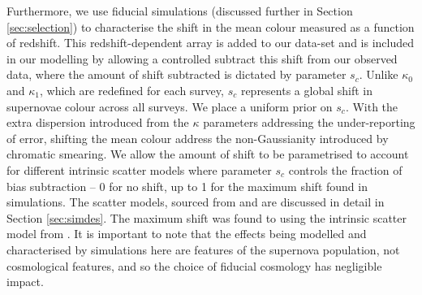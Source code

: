 \documentclass[a4paper,fleqn,usenatbib]{mnras}
\newcommand{\green}{\color{forestgreen}}
\begin{document}
Furthermore, we use fiducial simulations (discussed further in Section \ref{sec:selection}) to characterise the shift in the mean colour measured as a function of redshift. {\green This redshift-dependent array is added to our data-set and is included in our modelling by allowing a controlled subtract this shift from our observed data, where the amount of shift subtracted is dictated by parameter $s_c$. Unlike $\kappa_0$ and $\kappa_1$, which are redefined for each survey, $s_c$ represents a global shift in supernovae colour across all surveys. We place a uniform prior on $s_c$.} With the extra dispersion introduced from the $\kappa$ parameters addressing the under-reporting of error, shifting the mean colour address the non-Gaussianity introduced by chromatic smearing. We allow the amount of shift to be parametrised to account for different intrinsic scatter models where parameter $s_c$ controls the fraction of bias subtraction -- 0 for no shift, up to 1 for the maximum shift found in simulations. The scatter models, sourced from \citet{Guy2010} and \citet{Chotard2011} are discussed in detail in Section \ref{sec:simdes}. The maximum shift was found to using the intrinsic scatter model from \citet{Chotard2011}. It is important to note that the effects being modelled and characterised by simulations here are features of the supernova population, not cosmological features, and so the choice of fiducial cosmology has negligible impact.
\end{document}
